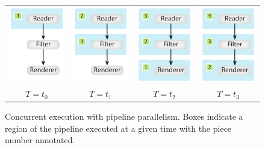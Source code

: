 \documentclass[journal,twocolumn,10pt,letterpaper,twoside]{IEEEtran}
\begin{document}
\begin{figure}[htbp]
  \centering
  \begin{tabular}{@{}c@{\qquad}c@{\qquad}c@{\qquad}c@{}}
    \includegraphics[scale=.9]{images/PipelineParallel0} &
    \includegraphics[scale=.9]{images/PipelineParallel1} &
    \includegraphics[scale=.9]{images/PipelineParallel2} &
    \includegraphics[scale=.9]{images/PipelineParallel3} \\
    $T = t_0$ & $T = t_1$ & $T = t_2$ & $T= t_3$
  \end{tabular}
  \caption{Concurrent execution with pipeline parallelism.  Boxes indicate
    a region of the pipeline executed at a given time with the piece number
    annotated.}
  \label{fig:PipelineParallelism}
\end{figure}
\end{document}
